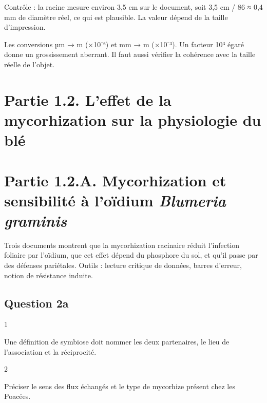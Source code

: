 \documentclass[11pt,a4paper]{article}
\begin{document}
Contrôle : la racine mesure environ 3,5 cm sur le document, soit 3,5 cm / 86 ≈ 0,4 mm de diamètre réel, ce qui est plausible. La valeur dépend de la taille d'impression.

\begin{piege}

Les conversions µm → m (×10⁻⁶) et mm → m (×10⁻³). Un facteur 10³ égaré donne un grossissement aberrant. Il faut aussi vérifier la cohérence avec la taille réelle de l'objet.

\end{piege}

\hypertarget{partie-1.2.-leffet-de-la-mycorhization-sur-la-physiologie-du-bluxe9}{%
\section{Partie 1.2. L'effet de la mycorhization sur la physiologie du blé}\label{partie-1.2.-leffet-de-la-mycorhization-sur-la-physiologie-du-bluxe9}}

\hypertarget{partie-1.2.a.-mycorhization-et-sensibilituxe9-uxe0-louxefdium-blumeria-graminis}{%
\section{\texorpdfstring{Partie 1.2.A. Mycorhization et sensibilité à l'oïdium \emph{Blumeria graminis}}{Partie 1.2.A. Mycorhization et sensibilité à l'oïdium Blumeria graminis}}\label{partie-1.2.a.-mycorhization-et-sensibilituxe9-uxe0-louxefdium-blumeria-graminis}}

Trois documents montrent que la mycorhization racinaire réduit l'infection foliaire par l'oïdium, que cet effet dépend du phosphore du sol, et qu'il passe par des défenses pariétales. Outils : lecture critique de données, barres d'erreur, notion de résistance induite.

\hypertarget{question-2a}{%
\subsection{Question 2a}\label{question-2a}}

\begin{indication}{1}

Une définition de symbiose doit nommer les deux partenaires, le lieu de l'association et la réciprocité.

\end{indication}

\begin{indication}{2}

Préciser le sens des flux échangés et le type de mycorhize présent chez les Poacées.

\end{indication}
\end{document}
